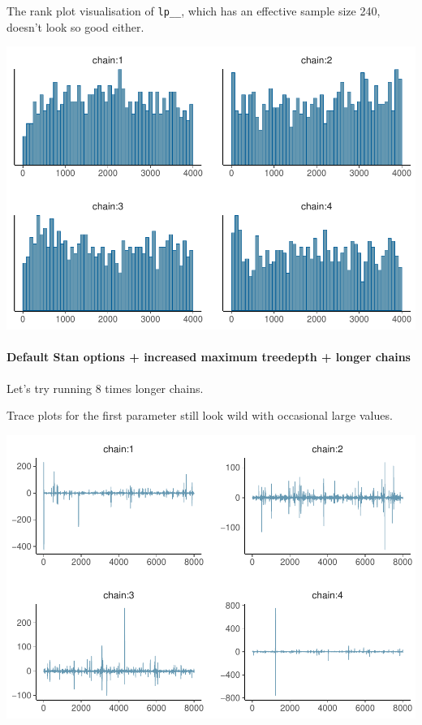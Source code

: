 \documentclass[american,]{article}
\let\oldparagraph\paragraph
\renewcommand{\paragraph}[1]{\oldparagraph{#1}\mbox{}}
\begin{document}
The rank plot visualisation of \texttt{lp\_\_}, which has an effective
sample size 240, doesn't look so good either.

\includegraphics{graphics/hist-fit-nom-td20-lp-1.pdf}

\hypertarget{default-stan-options-increased-maximum-treedepth-longer-chains}{%
\paragraph{Default Stan options + increased maximum treedepth + longer
chains}\label{default-stan-options-increased-maximum-treedepth-longer-chains}}

Let's try running 8 times longer chains.

Trace plots for the first parameter still look wild with occasional
large values.

\includegraphics{graphics/trace-fit-nom-td20l-1.pdf}
\end{document}
